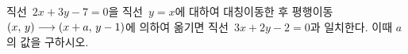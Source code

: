 직선~$2x+3y-7=0$을 직선~$y=x$에 대하여 대칭이동한 후 평행이동 $(x,\mkern3mu y)\longrightarrow(x+a,\mkern3mu y-1)$에 의하여 옮기면 직선~$3x+2y-2=0$과 일치한다. 이때 $a$의 값을 구하시오.
